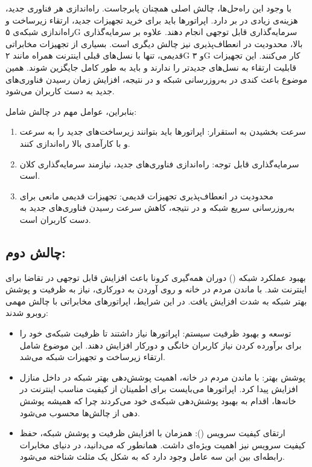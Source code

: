\documentclass[landscape, 12pt]{report}
\begin{document}
با وجود این راه‌حل‌ها، چالش اصلی همچنان پابرجاست. راه‌اندازی هر فناوری جدید، هزینه‌ی زیادی در بر دارد. اپراتورها باید برای خرید تجهیزات جدید، ارتقاء زیرساخت و راه‌اندازی شبکه‌ی ۵G سرمایه‌گذاری قابل توجهی انجام دهند.
علاوه بر سرمایه‌گذاری بالا، محدودیت در انعطاف‌پذیری نیز چالش دیگری است. بسیاری از تجهیزات مخابراتی قدیمی، تنها با نسل‌های قبلی اینترنت همراه مانند ۲G و ۳G  کار می‌کنند. این تجهیزات قابلیت ارتقاء به نسل‌های جدیدتر را ندارند و باید به طور کامل جایگزین شوند. همین موضوع باعث کندی در به‌روزرسانی شبکه و در نتیجه، افزایش زمان رسیدن فناوری‌های جدید به دست کاربران می‌شود.

بنابراین، عوامل مهم در چالش  شامل:
\begin{enumerate}
\item سرعت بخشیدن به استقرار: اپراتورها باید بتوانند زیرساخت‌های جدید را به سرعت و با کارآمدی بالا راه‌اندازی کنند.
\item سرمایه‌گذاری قابل توجه: راه‌اندازی فناوری‌های جدید، نیازمند سرمایه‌گذاری کلان است.
\item محدودیت در انعطاف‌پذیری تجهیزات قدیمی: تجهیزات قدیمی مانعی برای به‌روزرسانی سریع شبکه و در نتیجه، کاهش سرعت رسیدن فناوری‌های جدید به دست کاربران است.
\end{enumerate}
\subsection*{چالش دوم:}
 بهبود عملکرد شبکه () 
دوران همه‌گیری کرونا باعث افزایش قابل توجهی در تقاضا برای اینترنت شد. با ماندن مردم در خانه و روی آوردن به دورکاری، نیاز به ظرفیت و پوشش بهتر شبکه به شدت افزایش یافت. در این شرایط، اپراتورهای مخابراتی با چالش مهمی روبرو شدند:
\begin{itemize}
\item توسعه و بهبود ظرفیت سیستم: اپراتورها نیاز داشتند تا ظرفیت شبکه‌ی خود را برای برآورده کردن نیاز کاربران خانگی و دورکار افزایش دهند. این موضوع شامل ارتقاء زیرساخت و تجهیزات شبکه می‌شد.
\item پوشش بهتر: با ماندن مردم در خانه، اهمیت پوشش‌دهی بهتر شبکه در داخل منازل افزایش پیدا کرد. اپراتورها می‌بایست برای اطمینان از کیفیت مناسب اینترنت در خانه‌ها، اقدام به بهبود پوشش‌دهی شبکه‌ی خود می‌کردند چرا که همیشه پوشش دهی  از چالش‌ها محسوب می‌شود.
\item ارتقای کیفیت سرویس (): همزمان با افزایش ظرفیت و پوشش شبکه، حفظ کیفیت سرویس نیز اهمیت ویژه‌ای داشت. همانطور که می‌دانید، در دنیای مخابرات رابطه‌ای بین این سه عامل وجود دارد که به شکل یک مثلث شناخته می‌شود.
\end{itemize}
\end{document}

